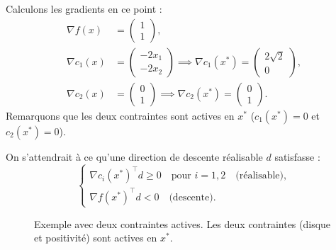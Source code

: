 Calculons les gradients en ce point :
\begin{align*}
    \nabla f(x) &= \begin{pmatrix} 1 \\ 1 \end{pmatrix}, \\
    \nabla c_1(x) &= \begin{pmatrix} -2x_1 \\ -2x_2 \end{pmatrix} \implies \nabla c_1(x^*) = \begin{pmatrix} 2\sqrt{2} \\ 0 \end{pmatrix}, \\
    \nabla c_2(x) &= \begin{pmatrix} 0 \\ 1 \end{pmatrix} \implies \nabla c_2(x^*) = \begin{pmatrix} 0 \\ 1 \end{pmatrix}.
\end{align*}
Remarquons que les deux contraintes sont actives en $x^*$ ($c_1(x^*) = 0$ et $c_2(x^*) = 0$).

On s'attendrait à ce qu'une direction de descente réalisable $d$ satisfasse :
\begin{equation}
    \begin{cases}
        \nabla c_i(x^*)^\top d \ge 0 \quad \text{pour } i=1, 2 \quad \text{(réalisable)}, \\
        \nabla f(x^*)^\top d < 0 \quad \text{(descente)}.
    \end{cases}
\end{equation}

\begin{figure}[H]
\centering
{}
\caption{Exemple avec deux contraintes actives. Les deux contraintes (disque et positivité) sont actives en $x^*$.}
\label{fig:ex-two-inequalities}
\end{figure}


